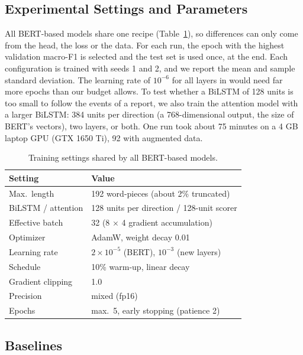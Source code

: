 \documentclass[conference]{IEEEtran}
\begin{document}
\subsection{Experimental Settings and Parameters}

All BERT-based models share one recipe (Table~\ref{tab:settings}), so differences can only come from the head, the loss or the data. For each run, the epoch with the highest validation macro-F1 is selected and the test set is used once, at the end. Each configuration is trained with seeds 1 and 2, and we report the mean and sample standard deviation. The learning rate of $10^{-6}$ for all layers in \cite{zhao2025causation} would need far more epochs than our budget allows. To test whether a BiLSTM of 128 units is too small to follow the events of a report, we also train the attention model with a larger BiLSTM: 384 units per direction (a 768-dimensional output, the size of BERT's vectors), two layers, or both. One run took about 75 minutes on a 4 GB laptop GPU (GTX 1650 Ti), 92 with augmented data.

\begin{table}[t]
\caption{Training settings shared by all BERT-based models.}
\label{tab:settings}
\centering
\footnotesize
\begin{tabular}{ll}
\toprule
Setting & Value \\
\midrule
Max.\ length & 192 word-pieces (about 2\% truncated) \\
BiLSTM / attention & 128 units per direction / 128-unit scorer \\
Effective batch & 32 (8 $\times$ 4 gradient accumulation) \\
Optimizer & AdamW, weight decay 0.01 \\
Learning rate & $2\times10^{-5}$ (BERT), $10^{-3}$ (new layers) \\
Schedule & 10\% warm-up, linear decay \\
Gradient clipping & 1.0 \\
Precision & mixed (fp16) \\
Epochs & max.\ 5, early stopping (patience 2) \\
\bottomrule
\end{tabular}
\end{table}

\subsection{Baselines}
\end{document}
